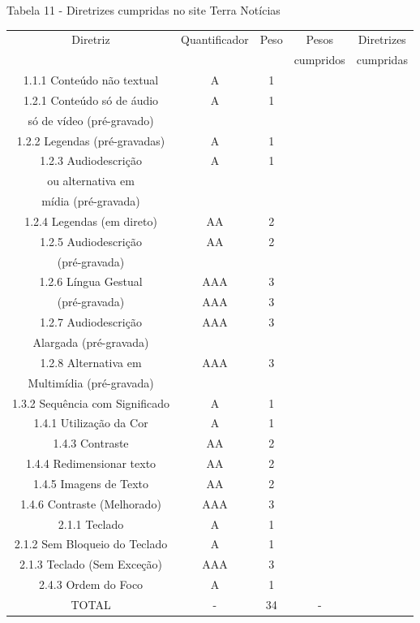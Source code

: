 \documentclass[a4paper]{article}
\begin{document}
\begin{titlepage}
Tabela 11 - Diretrizes cumpridas no site Terra Notícias\\[-1cm]
\begin{center}
	\fontsize{8pt}{8pt}\selectfont	
	\begin{longtable}{|c|c|c|c|c|}
		\hline
		Diretriz & Quantificador & Peso & Pesos & Diretrizes\\
		& & & cumpridos & cumpridas\\
		\hline
		1.1.1 Conteúdo não textual & A & 1 & & \\
		\hline
		1.2.1 Conteúdo só de áudio & A & 1 & & \\
		só de vídeo (pré-gravado) & & & & \\
		\hline
		1.2.2 Legendas (pré-gravadas) & A & 1 & & \\
		\hline
		1.2.3 Audiodescrição & A & 1 & & \\
		ou alternativa em & & & & \\
		mídia (pré-gravada) & & & & \\
		\hline
		1.2.4 Legendas (em direto) & AA & 2 & & \\
		\hline
		1.2.5 Audiodescrição & AA & 2 & & \\
		(pré-gravada) & & & & \\
		\hline
		1.2.6 Língua Gestual & AAA & 3 & & \\
		(pré-gravada) & AAA & 3 & & \\
		\hline
		1.2.7 Audiodescrição & AAA & 3 & & \\
		Alargada (pré-gravada) & & & & \\
		\hline
		1.2.8 Alternativa em & AAA & 3 & & \\
		Multimídia (pré-gravada) & & & & \\
		\hline
		1.3.2 Sequência com Significado & A & 1 & & \\
		\hline
		1.4.1 Utilização da Cor & A & 1 & & \\
		\hline
		1.4.3 Contraste & AA & 2 & & \\
		\hline
		1.4.4 Redimensionar texto & AA & 2 & & \\
		\hline
		1.4.5 Imagens de Texto & AA & 2 & & \\
		\hline
		1.4.6 Contraste (Melhorado) & AAA & 3 & & \\
		\hline
		2.1.1 Teclado & A & 1 & & \\
		\hline
		2.1.2 Sem Bloqueio do Teclado & A & 1 & & \\
		\hline
		2.1.3 Teclado (Sem Exceção) & AAA & 3 & & \\
		\hline
		2.4.3 Ordem do Foco & A & 1 & & \\
		\hline
		TOTAL & - & 34 & - & \\
		\hline
	\end{longtable}
\end{center}


\end{titlepage}
\end{document}
